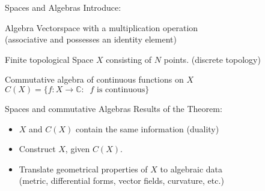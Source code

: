 \documentclass[fleqn]{beamer}
\begin{document}
    \begin{frame}{Spaces and Algebras}
        Introduce:
        \begin{block}
            {Algebra}
            \centering
            Vectorspace with a multiplication operation\\
            (associative and possesses an identity element)
        \end{block}
        \begin{block}
            {Finite topological Space $X$ consisting of $N$ points. (discrete topology)}
            \begin{figure}[h!]
            \centering
            \end{figure}

        \end{block}
        \begin{block}{Commutative algebra of continuous functions on $X$}
            \centering
             $C(X) = \{ f: X \rightarrow \mathbb{C}:\;\;
             \text{$f$ is continuous}\}$
        \end{block}
    \end{frame}
    \begin{frame}
        {Spaces and commutative Algebras}
        Results of the Theorem:
            \begin{itemize}
                \item $X$ and $C(X)$ contain the same information (duality)
                \item Construct $X$, given $C(X)$.
                \item Translate geometrical properties of $X$ to algebraic data\\
                    (metric, differential forms, vector fields, curvature, etc.)
            \end{itemize}
    \end{frame}
\end{document}
